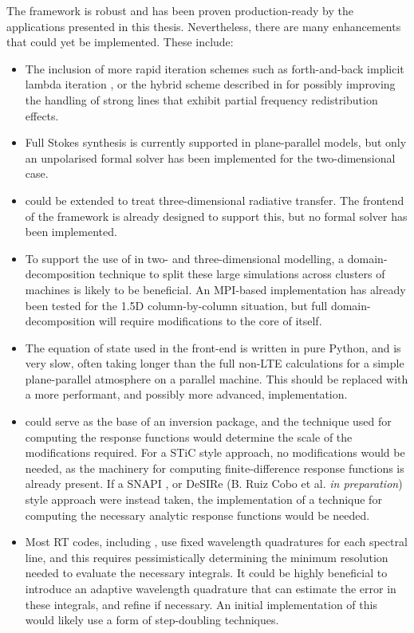 The \Lw{} framework is robust and has been proven production-ready by the applications presented in this thesis.
Nevertheless, there are many enhancements that could yet be implemented.
These include:
\begin{itemize}
	\item The inclusion of more rapid iteration schemes such as forth-and-back implicit lambda iteration \citep{AtanackovicVukmanovic1997,Kuzmanovska2017}, or the hybrid scheme described in \citet{Avrett2008} for possibly improving the handling of strong lines that exhibit partial frequency redistribution effects.
	\item Full Stokes synthesis is currently supported in plane-parallel models, but only an unpolarised formal solver has been implemented for the two-dimensional case.
	\item \Lw{} could be extended to treat three-dimensional radiative transfer. The frontend of the framework is already designed to support this, but no formal solver has been implemented.
	\item To support the use of \Lw{} in two- and three-dimensional modelling, a domain-decomposition technique to split these large simulations across clusters of machines is likely to be beneficial. An MPI-based implementation has already been tested for the 1.5D column-by-column situation, but full domain-decomposition will require modifications to the core of \Lw{} itself.
	\item The equation of state used in the front-end is written in pure Python, and is very slow, often taking longer than the full non-LTE calculations for a simple plane-parallel atmosphere on a parallel machine. This should be replaced with a more performant, and possibly more advanced, implementation.
	\item \Lw{} could serve as the base of an inversion package, and the technique used for computing the response functions would determine the scale of the modifications required. For a STiC \citep{2019dlcr} style approach, no modifications would be needed, as the machinery for computing finite-difference response functions is already present. If a SNAPI \citep{Milic2018}, or DeSIRe (B. Ruiz Cobo et al. \emph{in preparation}) style approach were instead taken, the implementation of a technique for computing the necessary analytic response functions would be needed.
	\item Most RT codes, including \Lw{}, use fixed wavelength quadratures for each spectral line, and this requires pessimistically determining the minimum resolution needed to evaluate the necessary integrals. It could be highly beneficial to introduce an adaptive wavelength quadrature that can estimate the error in these integrals, and refine if necessary. An initial implementation of this would likely use a form of step-doubling techniques.

\end{itemize}
